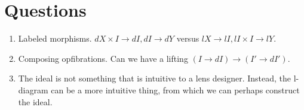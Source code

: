 \documentclass[a4paper,10pt]{article}
\begin{document}
\section{Questions}
\begin{enumerate}
 \item Labeled morphisms. $dX \times I \to dI, dI \to dY$ versus $lX \to lI, lI \times I \to lY$.
 \item Composing opfibrations. Can we have a lifting $(I \to dI) \to (I' \to dI')$.
 \item The ideal is not something that is intuitive to a lens designer. Instead, the l-diagram can be a more intuitive thing, from which we can perhaps construct the ideal.
\end{enumerate}
\end{document}
